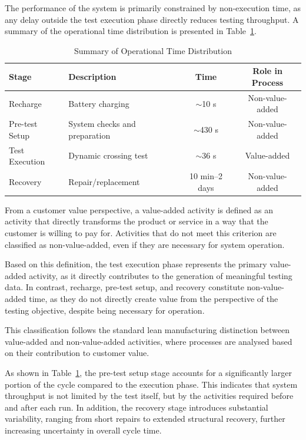 \documentclass[11pt, a4paper]{report}
\numberwithin{equation}{section}
\begin{document}
The performance of the system is primarily constrained by non-execution time, as any delay outside the test execution phase directly reduces testing throughput. A summary of the operational time distribution is presented in Table~\ref{tab:operation_time}.

\begin{table}[H]
\centering
\small
\renewcommand{\arraystretch}{1.5}

\caption{Summary of Operational Time Distribution}
\label{tab:operation_time}

\begin{tabularx}{\textwidth}{l X c c}
\toprule
Stage & Description & Time & Role in Process \\
\midrule
Recharge & Battery charging & $\sim$10 s & Non-value-added \\
Pre-test Setup & System checks and preparation & $\sim$430 s & Non-value-added \\
Test Execution & Dynamic crossing test & $\sim$36 s & Value-added \\
Recovery & Repair/replacement & 10 min--2 days & Non-value-added \\
\bottomrule
\end{tabularx}
\end{table}

From a customer value perspective, a value-added activity is defined as an activity that directly transforms the product or service in a way that the customer is willing to pay for. Activities that do not meet this criterion are classified as non-value-added, even if they are necessary for system operation.\cite{value_added}

Based on this definition, the test execution phase represents the primary value-added activity, as it directly contributes to the generation of meaningful testing data. In contrast, recharge, pre-test setup, and recovery constitute non-value-added time, as they do not directly create value from the perspective of the testing objective, despite being necessary for operation.

This classification follows the standard lean manufacturing distinction between value-added and non-value-added activities, where processes are analysed based on their contribution to customer value.

As shown in Table~\ref{tab:operation_time}, the pre-test setup stage accounts for a significantly larger portion of the cycle compared to the execution phase. This indicates that system throughput is not limited by the test itself, but by the activities required before and after each run. In addition, the recovery stage introduces substantial variability, ranging from short repairs to extended structural recovery, further increasing uncertainty in overall cycle time.
\end{document}
